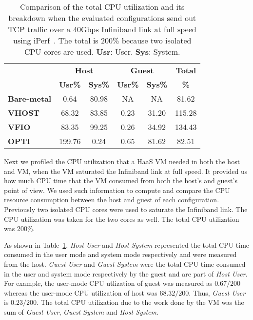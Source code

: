 \begin{table}[]
\renewcommand{\arraystretch}{1.2}
\small
\begin{center}
\begin{tabular}{|l|c|c|c|c|c|}
\hline
                    & \multicolumn{2}{c|}{\textbf{Host}}  & \multicolumn{2}{c|}{\textbf{Guest}} & \textbf{Total} \\ \cline{2-5}
                    & \textbf{Usr\%} & \textbf{Sys\%}    & \textbf{Usr\%} & \textbf{Sys\%}    & \textbf{\%}    \\ \hline
\textbf{Bare-metal} & 0.64            & 80.98             & NA              & NA                & 81.62          \\ \hline
\textbf{VHOST}      & 68.32           & 83.85             & 0.23            & 31.20             & 115.28         \\ \hline
\textbf{VFIO}       & 83.35           & 99.25             & 0.26            & 34.92             & 134.43         \\ \hline
\textbf{OPTI}       & 199.76          & 0.24              & 0.65            & 81.62             & 82.51          \\ \hline
\end{tabular}
\end{center}
\caption{Comparison of the total CPU utilization and its
breakdown when the evaluated configurations send out TCP
traffic over a 40Gbps Infiniband link at full speed using
iPerf~\cite{iperf}. The total is 200\% because two isolated
CPU cores are used. \textbf{Usr}: User. \textbf{Sys}: System.}
\label{tab:cpu_utilization_40gbps}
\end{table}

Next we profiled the CPU utilization that a HaaS VM needed in
both the host and VM, when the VM saturated the Infiniband
link at full speed. It provided us how much CPU time that the
VM consumed from both the host's and guest's point of view. We
used such information to compute and compare the CPU resource
consumption between the host and guest of each configuration.
Previously two isolated CPU cores were used to saturate the
Infiniband link. The CPU utilization was taken for the two
cores as well. The total CPU utilization was 200\%.

As shown in Table~\ref{tab:cpu_utilization_40gbps}, \emph{Host
User} and \emph{Host System} represented the total CPU time
consumed in the user mode and system mode respectively and
were measured from the host. \emph{Guest User} and \emph{Guest
System} were the total CPU time consumed in the user and
system mode respectively by the guest and are part of
\emph{Host User}. For example, the user-mode CPU utlization of
guest was measured as $0.67/200$ whereas the user-mode CPU
utilization of host was $68.32/200$. Thus, \emph{Guest User}
is $0.23/200$. The total CPU utilization due to the work done
by the VM was the sum of \emph{Guest User}, \emph{Guest
System} and \emph{Host System}.

